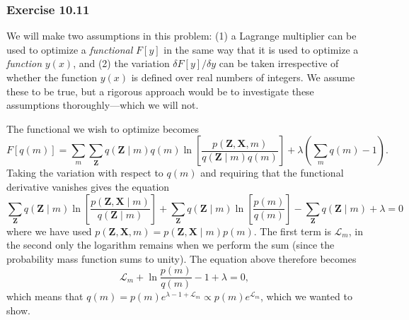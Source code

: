 \documentclass[12pt, a4paper]{article}
\newcommand{\vect}[1]{\bm{#1}}
\begin{document}
\subsubsection*{Exercise 10.11}
We will make two assumptions in this problem: 
(1) a Lagrange multiplier can be used to optimize a \emph{functional} $F[y]$ in the same way that it is used to optimize a \emph{function} $y(x)$, and
(2) the variation $\delta F[y] / \delta y$ can be taken irrespective of whether the function $y(x)$ is defined over real numbers of integers.
We assume these to be true, but a rigorous approach would be to investigate these assumptions thoroughly---which we will not.

The functional we wish to optimize becomes
\begin{equation*}
	F[q(m)]
	=
	\sum_{m}
	\sum_{\vect{Z}}
	q\left(\vect{Z} \mid m \right)
	q(m)
	\ln \left[
	\frac{p(\vect{Z}, \vect{X}, m)}{q\left(\vect{Z} \mid m \right)
		q(m)}
	\right]
	+ \lambda \left( \sum_{m} q(m) -1 \right).
\end{equation*}
Taking the variation with respect to $q(m)$ and requiring that the functional derivative vanishes gives the equation
\begin{equation*}
	\sum_{\vect{Z}}
	q\left(\vect{Z} \mid m \right)
	\ln \left[
	\frac{p(\vect{Z}, \vect{X} \mid m)}{q\left(\vect{Z} \mid m \right)}
	\right]
	+
	\sum_{\vect{Z}}
	q\left(\vect{Z} \mid m \right)
	\ln \left[
	\frac{p( m)}{q(m)}
	\right]
	-
	\sum_{\vect{Z}} q\left(\vect{Z} \mid m \right) + \lambda = 0
\end{equation*}
where we have used $p(\vect{Z}, \vect{X} , m) = p(\vect{Z}, \vect{X} \mid m) p( m)$.
The first term is $\mathcal{L}_m$, in the second only the logarithm remains when we perform the sum (since the probability mass function sums to unity).
The equation above therefore becomes
\begin{equation*}
	\mathcal{L}_m +  \ln 
	\frac{p( m)}{q(m)}
	-1
	+\lambda = 0,
\end{equation*}
which means that $q(m) = p(m) e^{ \lambda - 1 + \mathcal{L}_m}
\propto p(m) e^{\mathcal{L}_m}$, which we wanted to show.
\end{document}
